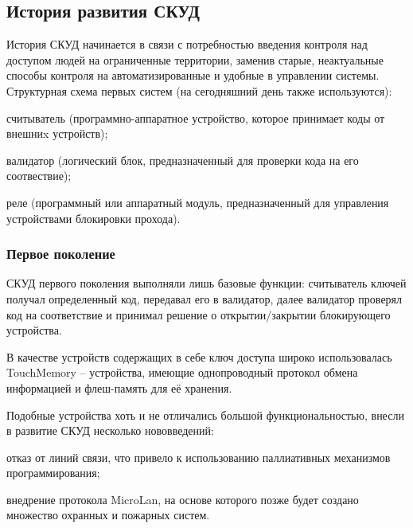 \subsection{История развития СКУД}

История СКУД начинается в связи с потребностью введения контроля над доступом людей на ограниченные территории, заменив старые, неактуальные способы контроля на автоматизированные и удобные в управлении системы. Структурная схема первых систем (на сегодняшний день также используются):

\begin{itemize*}
\item считыватель (программно-аппаратное устройство, которое принимает коды от внешниx устройств);
\item валидатор (логический блок, предназначенный для проверки кода на его соотвествие);
\item реле (программный или аппаратный модуль, предназначенный для управления устройствами блокировки прохода).
\end{itemize*}

\subsubsection{Первое поколение}

СКУД первого поколения выполняли лишь базовые функции: считыватель ключей получал определенный код, передавал его в валидатор, далее валидатор проверял код на соответствие и принимал решение о открытии/закрытии блокирующего устройства.


В качестве устройств содержащих в себе ключ доступа широко использовалась TouchMemory -- устройства, имеющие однопроводный протокол обмена информацией и флеш-память для её хранения.


Подобные устройства хоть и не отличались большой функциональностью, внесли в развитие СКУД несколько нововведений:

\begin{itemize*}
\item отказ от линий связи, что привело к использованию паллиативных механизмов программирования;
\item внедрение протокола MicroLan, на основе которого позже будет создано множество охранных и пожарных систем.
\end{itemize*}

